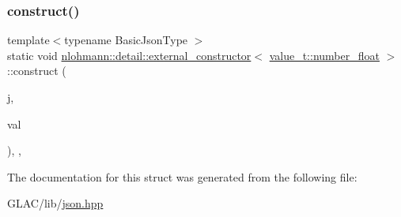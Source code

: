\subsubsection{\texorpdfstring{construct()}{construct()}}
{\footnotesize\ttfamily template$<$typename Basic\+Json\+Type $>$ \\
static void \mbox{\hyperlink{structnlohmann_1_1detail_1_1external__constructor}{nlohmann\+::detail\+::external\+\_\+constructor}}$<$ \mbox{\hyperlink{namespacenlohmann_1_1detail_a90aa5ef615aa8305e9ea20d8a947980fad9966ecb59667235a57b4b999a649eef}{value\+\_\+t\+::number\+\_\+float}} $>$\+::construct (\begin{DoxyParamCaption}\item[{Basic\+Json\+Type \&}]{j,  }\item[{typename Basic\+Json\+Type\+::number\+\_\+float\+\_\+t}]{val }\end{DoxyParamCaption})\hspace{0.3cm}{\ttfamily [inline]}, {\ttfamily [static]}, {\ttfamily [noexcept]}}



The documentation for this struct was generated from the following file\+:\begin{DoxyCompactItemize}
\item 
G\+L\+A\+C/lib/\mbox{\hyperlink{json_8hpp}{json.\+hpp}}\end{DoxyCompactItemize}
